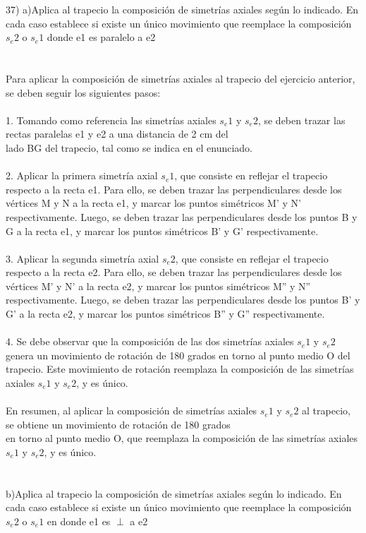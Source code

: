 \documentclass{article}
\begin{document}
37)
a)Aplica al trapecio la composición de simetrías axiales según lo indicado. En cada caso establece si existe un único movimiento que reemplace la composición $s_e2$ o $s_e1$ donde e1 es paralelo a e2 \\
\\ \\
Para aplicar la composición de simetrías axiales al trapecio del ejercicio anterior, se deben seguir los siguientes pasos:\\
\\
1. Tomando como referencia las simetrías axiales $s_e1$ y $s_e2$, se deben trazar las rectas paralelas e1 y e2 a una distancia de 2 cm del\\
lado BG del trapecio, tal como se indica en el enunciado.\\
\\
2. Aplicar la primera simetría axial $s_e1$, que consiste en reflejar el trapecio respecto a la recta e1. Para ello, se deben trazar las perpendiculares desde los vértices M y N a la recta e1, y marcar los puntos simétricos M' y N' respectivamente. Luego, se deben trazar las perpendiculares desde los puntos B y G a la recta e1, y marcar los puntos simétricos B' y G' respectivamente.\\
\\
3. Aplicar la segunda simetría axial $s_e2$, que consiste en reflejar el trapecio respecto a la recta e2. Para ello, se deben trazar las perpendiculares desde los vértices M' y N' a la recta e2, y marcar los puntos simétricos M'' y N'' respectivamente. Luego, se deben trazar las perpendiculares desde los puntos B' y G' a la recta e2, y marcar los puntos simétricos B'' y G'' respectivamente.\\
\\
4. Se debe observar que la composición de las dos simetrías axiales $s_e1$ y $s_e2$ genera un movimiento de rotación de 180 grados en torno al punto medio O del trapecio. Este movimiento de rotación reemplaza la composición de las simetrías axiales $s_e1$ y $s_e2$, y es único.\\
\\
En resumen, al aplicar la composición de simetrías axiales $s_e1$ y $s_e2$ al trapecio, se obtiene un movimiento de rotación de 180 grados\\
en torno al punto medio O, que reemplaza la composición de las simetrías axiales $s_e1$ y $s_e2$, y es único.\\
\\
\\
b)Aplica al trapecio la composición de simetrías axiales según lo indicado. En cada caso establece si existe un único movimiento que reemplace la composición $s_e2$ o $s_e1$  en donde e1 es $\perp$ a e2\\
\end{document}
